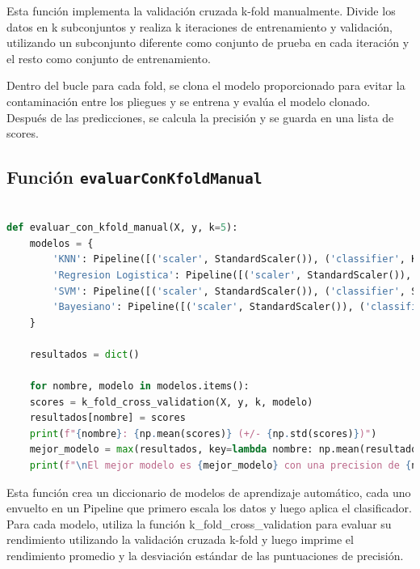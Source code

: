 \documentclass[12pt]{article}
\begin{document}
Esta función implementa la validación cruzada k-fold manualmente. Divide los datos en k subconjuntos y realiza k iteraciones de entrenamiento y validación, utilizando un subconjunto diferente como conjunto de prueba en cada iteración y el resto como conjunto de entrenamiento.

Dentro del bucle para cada fold, se clona el modelo proporcionado para evitar la contaminación entre los pliegues y se entrena y evalúa el modelo clonado. Después de las predicciones, se calcula la precisión y se guarda en una lista de scores.

\vspace{1cm}

\subsection*{Función \texttt{evaluarConKfoldManual}}
\vspace{1cm}

\begin{lstlisting}[language=Python]

def evaluar_con_kfold_manual(X, y, k=5):
	modelos = {
		'KNN': Pipeline([('scaler', StandardScaler()), ('classifier', KNeighborsClassifier(n_neighbors=5))]),
		'Regresion Logistica': Pipeline([('scaler', StandardScaler()), ('classifier', LogisticRegression(random_state=42))]),
		'SVM': Pipeline([('scaler', StandardScaler()), ('classifier', SVC(kernel='linear', random_state=42))]),
		'Bayesiano': Pipeline([('scaler', StandardScaler()), ('classifier', GaussianNB())])
	}
	
	resultados = dict()

	for nombre, modelo in modelos.items():
	scores = k_fold_cross_validation(X, y, k, modelo)
	resultados[nombre] = scores
	print(f"{nombre}: {np.mean(scores)} (+/- {np.std(scores)})")
	mejor_modelo = max(resultados, key=lambda nombre: np.mean(resultados[nombre]))
	print(f"\nEl mejor modelo es {mejor_modelo} con una precision de {np.mean(resultados[mejor_modelo])}.")

\end{lstlisting}
\vspace{1cm}

Esta función crea un diccionario de modelos de aprendizaje automático, cada uno envuelto en un Pipeline que primero escala los datos y luego aplica el clasificador. Para cada modelo, utiliza la función k\_fold\_cross\_validation para evaluar su rendimiento utilizando la validación cruzada k-fold y luego imprime el rendimiento promedio y la desviación estándar de las puntuaciones de precisión.
\end{document}
